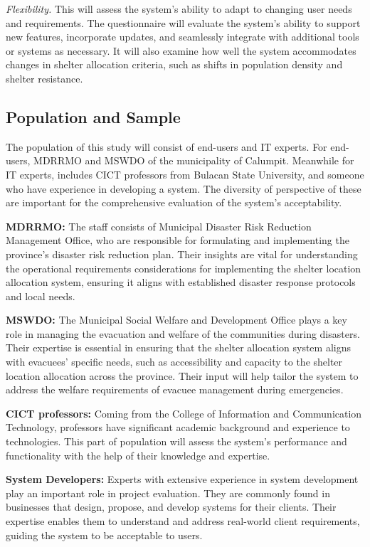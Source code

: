 	\textit{Flexibility.} This will assess the system’s ability to adapt to changing user needs and requirements. The questionnaire will evaluate the system's ability to support new features, incorporate updates, and seamlessly integrate with additional tools or systems as necessary. It will also examine how well the system accommodates changes in shelter allocation criteria, such as shifts in population density and shelter resistance.
	

\subsection{Population and Sample}
	The population of this study will consist of end-users and IT experts. For end-users,  MDRRMO and MSWDO of the municipality of Calumpit. Meanwhile for IT experts, includes CICT professors from Bulacan State University, and someone who have experience in developing a system.  The diversity of perspective of these are important for the comprehensive evaluation of the system’s acceptability.
	
	\textbf{MDRRMO:} The staff consists of Municipal Disaster Risk Reduction Management Office, who are responsible for formulating and implementing the province's disaster risk reduction plan.  Their insights are vital for understanding the operational requirements considerations for implementing the shelter location allocation system, ensuring it aligns with established disaster response protocols and local needs.
	
	\textbf{MSWDO:} The Municipal Social Welfare and Development Office plays a key role in managing the evacuation and welfare of the communities during disasters. Their expertise is essential in ensuring that the shelter allocation system aligns with evacuees' specific needs, such as accessibility and capacity to the shelter location allocation across the province. Their input will help tailor the system to address the welfare requirements of evacuee management during emergencies.
	
	\textbf{CICT professors:} Coming from the College of Information and Communication Technology, professors have significant academic background and experience to technologies. This part of population will assess the system's performance and functionality with the help of their knowledge and expertise.
	
	\textbf{System Developers:} Experts with extensive experience in system development play an important role in project evaluation. They are commonly found in businesses that design, propose, and develop systems for their clients. Their expertise enables them to understand and address real-world client requirements, guiding the system to be acceptable to users.
	
